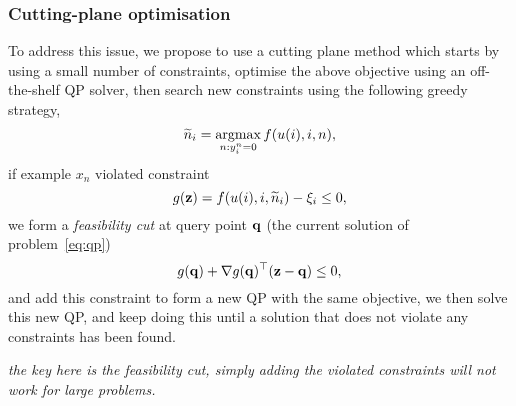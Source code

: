 \subsubsection{Cutting-plane optimisation}

To address this issue, we propose to use a cutting plane method which starts by using a small number of constraints,
optimise the above objective using an off-the-shelf QP solver,
then search new constraints using the following greedy strategy,
\begin{equation*}
\widetilde n_i = \operatorname*{argmax}_{n: y_i^n=0} f(u(i), i, n),
\end{equation*}
if example $x_n$ violated constraint
\begin{equation*}
g(\mathbf{z}) = f(u(i), i, \widetilde n_i) - \xi_i \le 0,
\end{equation*}
we form a \emph{feasibility cut} at query point $\mathbf{q}$ (\ie the current solution of problem~\ref{eq:qp})
$$
g(\mathbf{q}) + \nabla g(\mathbf{q})^\top (\mathbf{z} - \mathbf{q}) \le 0,
$$
and add this constraint to form a new QP with the same objective,
we then solve this new QP, and keep doing this until a solution that does not violate any constraints has been found.

{\it the key here is the feasibility cut, simply adding the violated constraints will not work for large problems.}
